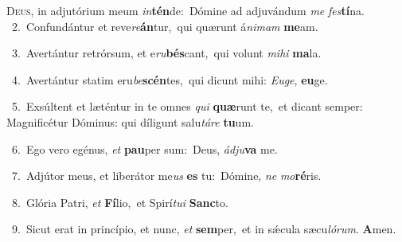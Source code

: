 \lettrine{\initial\textcolor{\initialcolor}{D}}{eus,} in adjutórium meum \textit{in}\-\textbf{tén}de:~\star Dómine ad adjuvándum \textit{me} \textit{fes}\-\textbf{tí}na.\\
{\numbfont\textcolor{\numbcolor}{~2.}}~Confundántur et reve\-\textit{re}\-\textbf{án}tur,~\star qui quærunt á\-\textit{ni}\-\textit{mam} \textbf{me}\-am.\par
{\numbfont\textcolor{\numbcolor}{~3.}}~Avertántur retrórsum, et e\-\textit{ru}\-\textbf{bés}cant,~\star qui volunt \textit{mi}\-\textit{hi} \textbf{ma}\-la.\par
{\numbfont\textcolor{\numbcolor}{~4.}}~Avertántur statim eru\-\textit{be}\-\textbf{scén}tes,~\star qui dicunt mihi: \textit{Eu}\-\textit{ge}, \textbf{eu}\-ge.\par
{\numbfont\textcolor{\numbcolor}{~5.}}~Exsúltent et læténtur in te omnes \textit{qui} \textbf{quæ}\-runt te,~\star et dicant semper: Magnificétur Dóminus: qui díligunt salu\-\textit{tá}\-\textit{re} \textbf{tu}\-um.\par
{\numbfont\textcolor{\numbcolor}{~6.}}~Ego vero egénus, \textit{et} \textbf{pau}\-per sum:~\star Deus, \textit{ád}\-\textit{ju}\textbf{va} me.\par
{\numbfont\textcolor{\numbcolor}{~7.}}~Adjútor meus, et liberátor me\textit{us} \textbf{es} tu:~\star Dómine, \textit{ne} \textit{mo}\-\textbf{ré}ris.\par
{\numbfont\textcolor{\numbcolor}{~8.}}~Glória Patri, \textit{et} \textbf{Fí}\-lio,~\star et Spirí\-\textit{tu}\-\textit{i} \textbf{Sanc}\-to.\par
{\numbfont\textcolor{\numbcolor}{~9.}}~Sicut erat in princípio, et nunc, \textit{et} \textbf{sem}\-per,~\star et in sǽcula sæcu\-\textit{ló}\-\textit{rum}. \textbf{A}\-men.\par
